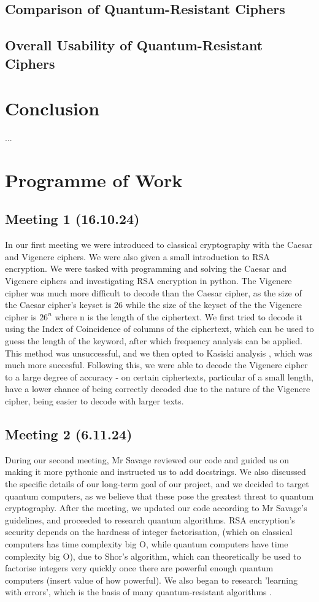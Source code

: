 \documentclass{article}
\begin{document}
\subsection{Comparison of Quantum-Resistant Ciphers}
\subsection{Overall Usability of Quantum-Resistant Ciphers}

\section{Conclusion}
   ...

\section{Programme of Work}
\subsection{Meeting 1 (16.10.24)}
In our first meeting we were introduced to classical cryptography with the
Caesar and Vigenere ciphers. We were also given a small introduction to RSA
encryption. We were tasked with programming and solving the Caesar and Vigenere
ciphers and investigating RSA encryption in python. The Vigenere cipher was
much more difficult to decode than the Caesar cipher, as the size of the Caesar
cipher's keyset is 26 while the size of the keyset of the the Vigenere cipher
is $ 26^n $ where n is the length of the ciphertext. We first tried to decode
it using the Index of Coincidence \cite{ioc} of columns of the ciphertext,
which can be used to guess the length of the keyword, after which frequency
analysis can be applied. This method was unsuccessful, and we then opted to
Kasiski analysis \cite{kasiski}, which was much more succesful. Following this,
we were able to decode the Vigenere cipher to a large degree of accuracy - on
certain ciphertexts, particular of a small length, have a lower chance of being
correctly decoded due to the nature of the Vigenere cipher, being easier to
decode with larger texts.

\subsection{Meeting 2 (6.11.24)}
During our second meeting, Mr Savage reviewed our code and guided us on making
it more pythonic and instructed us to add docstrings. We also discussed the
specific details of our long-term goal of our project, and we decided to target
quantum computers, as we believe that these pose the greatest threat to quantum
cryptography. After the meeting, we updated our code according to Mr Savage's
guidelines, and proceeded to research quantum algorithms. RSA encryption's
security depends on the hardness of integer factorisation, (which on classical
computers has time complexity big O, while quantum computers have time
complexity big O), due to Shor's algorithm, which can theoretically be used to
factorise integers very quickly once there are powerful enough quantum
computers (insert value of how powerful). We also began to research 'learning
with errors', which is the basis of many quantum-resistant algorithms
\cite{LWE}.
\end{document}
